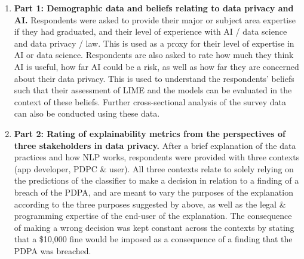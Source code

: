 \begin{enumerate}
	\item \textbf{Part 1: Demographic data and beliefs relating to data privacy and AI.} Respondents were asked to provide their major or subject area expertise if they had graduated, and their level of experience with AI / data science and data privacy / law. This is used as a proxy for their level of expertise in AI or data science. Respondents are also asked to rate how much they think AI is useful, how far AI could be a risk, as well as how far they are concerned about their data privacy. This is used to understand the respondents' beliefs such that their assessment of LIME and the models can be evaluated in the context of these beliefs. Further cross-sectional analysis of the survey data can also be conducted using these data.
	\item \textbf{Part 2: Rating of explainability metrics from the perspectives of three stakeholders in data privacy.} After a brief explanation of the data practices and how NLP works, respondents were provided with three contexts (app developer, PDPC \& user). All three contexts relate to solely relying on the predictions of the classifier to make a decision in relation to a finding of a breach of the PDPA, and are meant to vary the purposes of the explanation according to the three purposes suggested by \cite{doshi-velez2017} above, as well as the legal \& programming expertise of the end-user of the explanation. The consequence of making a wrong decision was kept constant across the contexts by stating that a \$10,000 fine would be imposed as a consequence of a finding that the PDPA was breached.
	

\end{enumerate}
